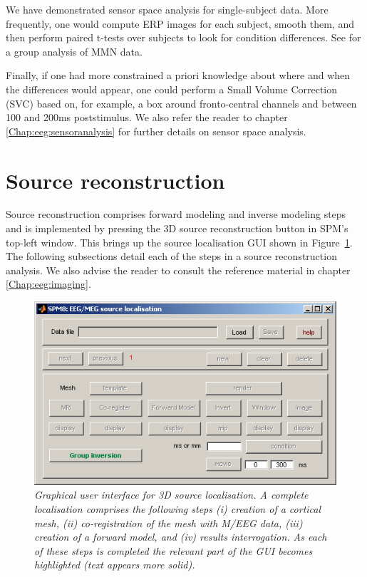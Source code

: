 We have demonstrated sensor space analysis for single-subject data. More frequently, one would compute ERP images for each subject, smooth them, and then perform paired t-tests over subjects to look for condition differences. See \cite{marta_mmndcm} for a group analysis of MMN data.
 
Finally, if one had more constrained a priori knowledge about where and when the differences would appear, one could perform a Small Volume Correction (SVC) based on, for example, a box around fronto-central channels and between 100 and 200ms poststimulus. We also refer the reader to chapter \ref{Chap:eeg:sensoranalysis} for further details on sensor space analysis.

\section{Source reconstruction}

Source reconstruction comprises forward modeling and inverse modeling steps and is implemented by pressing the 3D source reconstruction button in SPM's top-left window.
This brings up the source localisation GUI shown in Figure~\ref{source_gui}. The following subsections detail each of the steps in a source reconstruction analysis. We also advise the reader to consult the reference material in chapter \ref{Chap:eeg:imaging}.

\begin{figure}
\begin{center}
\includegraphics[width=120mm]{mmn/source_gui}
\caption{\em Graphical user interface for 3D source localisation. A complete localisation comprises the following steps (i) creation of a cortical mesh, (ii) co-registration of the mesh with M/EEG data, (iii) creation of a forward model, and (iv) results interrogation. As each of these steps is completed the relevant part of the GUI becomes highlighted (text appears more solid).
\label{source_gui}}
\end{center}
\end{figure}

